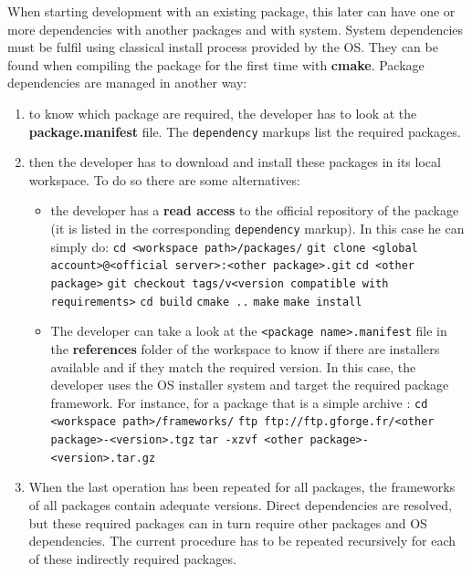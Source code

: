 \documentclass[12pt,a4paper]{article}
\begin{document}
When starting development with an existing package, this later can have one or more dependencies with another packages and with system. System dependencies must be fulfil using classical install process provided by the OS. They can be found when compiling the package for the first time with \textbf{cmake}. Package dependencies are managed in another way:
\begin{enumerate}
\item to know which package are required, the developer has to look at the \textbf{package.manifest} file. The \texttt{dependency} markups list the required packages.
\item then the developer has to download and install these packages in its local workspace. To do so there are some alternatives:
\begin{itemize}
\item the developer has a \textbf{read access} to the official repository of the package (it is listed in the corresponding \texttt{dependency} markup). In this case he can simply do:
\linebreak \verb|cd <workspace path>/packages/|
\linebreak \verb|git clone <global account>@<official server>:<other package>.git|
\linebreak \verb|cd <other package>|
\linebreak \verb|git checkout tags/v<version compatible with requirements>|
\linebreak \verb|cd build|
\linebreak \verb|cmake ..|
\linebreak \verb|make|
\linebreak \verb|make install|
\item The developer can take a look at the \texttt{<package name>.manifest} file in the \textbf{references} folder of the workspace to know if there are installers available and if they match the required version. In this case, the developer uses the OS installer system and target the required package framework. For instance, for a package that is a simple archive :
\linebreak \verb|cd <workspace path>/frameworks/|
\linebreak \verb|ftp ftp://ftp.gforge.fr/<other package>-<version>.tgz|
\linebreak \verb|tar -xzvf <other package>-<version>.tar.gz|
\end{itemize}
\item When the last operation has been repeated for all packages, the frameworks of all packages contain adequate versions. Direct dependencies are resolved, but these required packages can in turn require other packages and OS dependencies. The current procedure has to be repeated recursively for each of these indirectly required packages.
\end{enumerate}
\end{document}
